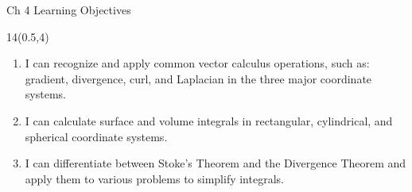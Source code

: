 \def\obja{ I can recognize and apply common vector calculus operations, such as: gradient, divergence, curl, and Laplacian in the three major coordinate systems.}
\def\objb{I can calculate surface and volume integrals in rectangular, cylindrical, and spherical coordinate systems. }
\def\objc{I can differentiate between Stoke's Theorem and the Divergence Theorem and apply them to various problems to simplify integrals. }
\begin{frame}{Ch 4 Learning Objectives}
	\begin{textblock}{14}(0.5,4)
	\begin{myblock}[0.95]{}
	\begin{enumerate}[{4}.1]
		\item \alert{ \obja }
		\item \alert{ \objb }
		\item \alert{ \objc }
	\end{enumerate}
	\end{myblock}
	\end{textblock}
\end{frame}